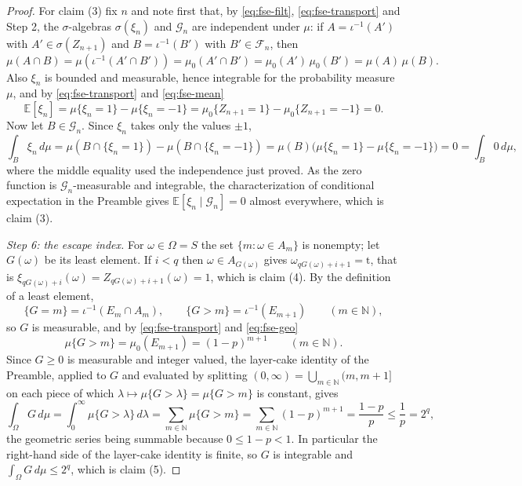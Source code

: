 \begin{proof}
For claim (3) fix $n$ and note first that, by \eqref{eq:fse-filt},
\eqref{eq:fse-transport} and Step 2, the $\sigma$-algebras
$\sigma(\xi_n)$ and $\mathcal G_n$ are independent under $\mu$: if
$A=\iota^{-1}(A')$ with $A'\in\sigma(Z_{n+1})$ and $B=\iota^{-1}(B')$ with
$B'\in\mathcal F_n$, then
\[
  \mu(A\cap B)=\mu(\iota^{-1}(A'\cap B'))=\mu_0(A'\cap B')
    =\mu_0(A')\,\mu_0(B')=\mu(A)\,\mu(B).
\]
Also $\xi_n$ is bounded and measurable, hence integrable for the probability
measure $\mu$, and by \eqref{eq:fse-transport} and \eqref{eq:fse-mean}
\[
  \mathbb E[\xi_n]=\mu\{\xi_n=1\}-\mu\{\xi_n=-1\}
    =\mu_0\{Z_{n+1}=1\}-\mu_0\{Z_{n+1}=-1\}=0 .
\]
Now let $B\in\mathcal G_n$. Since $\xi_n$ takes only the values $\pm1$,
\[
  \int_B\xi_n\,d\mu=\mu(B\cap\{\xi_n=1\})-\mu(B\cap\{\xi_n=-1\})
    =\mu(B)\bigl(\mu\{\xi_n=1\}-\mu\{\xi_n=-1\}\bigr)=0
    =\int_B0\,d\mu,
\]
where the middle equality used the independence just proved. As the zero
function is $\mathcal G_n$-measurable and integrable, the characterization of
conditional expectation in the Preamble gives
$\mathbb E[\xi_n\mid\mathcal G_n]=0$ almost everywhere, which is claim (3).

\emph{Step 6: the escape index.}
For $\omega\in\Omega=S$ the set $\{m:\omega\in A_m\}$ is nonempty; let
$G(\omega)$ be its least element. If $i<q$ then $\omega\in A_{G(\omega)}$ gives
$\omega_{qG(\omega)+i+1}=\mathrm t$, that is
$\xi_{qG(\omega)+i}(\omega)=Z_{qG(\omega)+i+1}(\omega)=1$, which is claim (4).
By the definition of a least element,
\[
  \{G=m\}=\iota^{-1}(E_m\cap A_m),\qquad
  \{G>m\}=\iota^{-1}(E_{m+1})\qquad(m\in\mathbb N),
\]
so $G$ is measurable, and by \eqref{eq:fse-transport} and \eqref{eq:fse-geo}
\begin{equation}\label{eq:fse-tail}
  \mu\{G>m\}=\mu_0(E_{m+1})=(1-p)^{m+1}\qquad(m\in\mathbb N).
\end{equation}
Since $G\ge0$ is measurable and integer valued, the layer-cake identity of the
Preamble, applied to $G$ and evaluated by splitting
$(0,\infty)=\bigcup_{m\in\mathbb N}(m,m+1]$ on each piece of which
$\lambda\mapsto\mu\{G>\lambda\}=\mu\{G>m\}$ is constant, gives
\[
  \int_\Omega G\,d\mu=\int_0^\infty\mu\{G>\lambda\}\,d\lambda
    =\sum_{m\in\mathbb N}\mu\{G>m\}
    =\sum_{m\in\mathbb N}(1-p)^{m+1}
    =\frac{1-p}{p}\le\frac1p=2^q,
\]
the geometric series being summable because $0\le1-p<1$. In particular the
right-hand side of the layer-cake identity is finite, so $G$ is integrable and
$\int_\Omega G\,d\mu\le2^q$, which is claim (5).
\end{proof}
